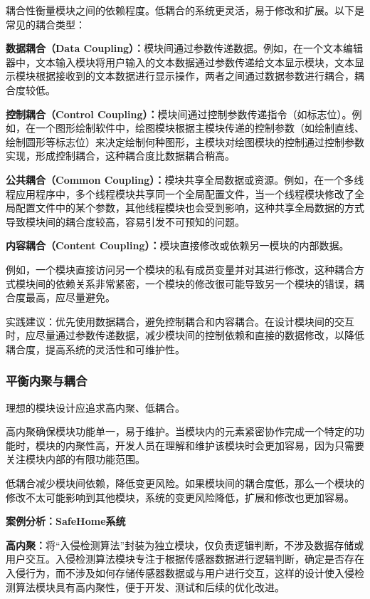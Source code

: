耦合性衡量模块之间的依赖程度。低耦合的系统更灵活，易于修改和扩展。以下是常见的耦合类型：

\textbf{数据耦合（Data Coupling）：}模块间通过参数传递数据。例如，在一个文本编辑器中，文本输入模块将用户输入的文本数据通过参数传递给文本显示模块，文本显示模块根据接收到的文本数据进行显示操作，两者之间通过数据参数进行耦合，耦合度较低。

\textbf{控制耦合（Control Coupling）：}模块间通过控制参数传递指令（如标志位）。例如，在一个图形绘制软件中，绘图模块根据主模块传递的控制参数（如绘制直线、绘制圆形等标志位）来决定绘制何种图形，主模块对绘图模块的控制通过控制参数实现，形成控制耦合，这种耦合度比数据耦合稍高。

\textbf{公共耦合（Common Coupling）：}模块共享全局数据或资源。例如，在一个多线程应用程序中，多个线程模块共享同一个全局配置文件，当一个线程模块修改了全局配置文件中的某个参数，其他线程模块也会受到影响，这种共享全局数据的方式导致模块间的耦合度较高，容易引发不可预知的问题。

\textbf{内容耦合（Content Coupling）：}模块直接修改或依赖另一模块的内部数据。

例如，一个模块直接访问另一个模块的私有成员变量并对其进行修改，这种耦合方式模块间的依赖关系非常紧密，一个模块的修改很可能导致另一个模块的错误，耦合度最高，应尽量避免。

实践建议：优先使用数据耦合，避免控制耦合和内容耦合。在设计模块间的交互时，应尽量通过参数传递数据，减少模块间的控制依赖和直接的数据修改，以降低耦合度，提高系统的灵活性和可维护性。

\subsubsection{平衡内聚与耦合}

理想的模块设计应追求高内聚、低耦合。

高内聚确保模块功能单一，易于维护。当模块内的元素紧密协作完成一个特定的功能时，模块的内聚性高，开发人员在理解和维护该模块时会更加容易，因为只需要关注模块内部的有限功能范围。

低耦合减少模块间依赖，降低变更风险。如果模块间的耦合度低，那么一个模块的修改不太可能影响到其他模块，系统的变更风险降低，扩展和修改也更加容易。

\textbf{案例分析：SafeHome系统}

\textbf{高内聚：}将``入侵检测算法''封装为独立模块，仅负责逻辑判断，不涉及数据存储或用户交互。入侵检测算法模块专注于根据传感器数据进行逻辑判断，确定是否存在入侵行为，而不涉及如何存储传感器数据或与用户进行交互，这样的设计使入侵检测算法模块具有高内聚性，便于开发、测试和后续的优化改进。

